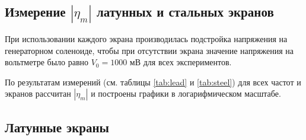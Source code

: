 \subsection{Измерение $|\eta_m|$ латунных и стальных экранов}

При использовании каждого экрана производилась подстройка напряжения на генераторном соленоиде, чтобы при отсутствии
экрана значение напряжения на вольтметре было равно $V_0=1000$ мВ для всех экспериментов.




По результатам измерений (см. таблицы \ref{tab:lead} и \ref{tab:steel}) для всех частот и экранов рассчитан $|\eta_m|$ и построены графики в логарифмическом
масштабе.



\subsection{Латунные экраны}

